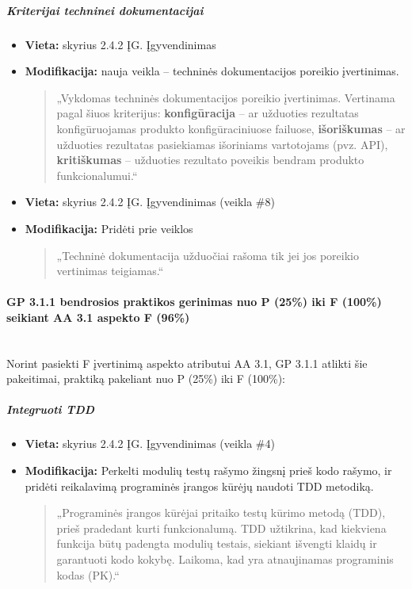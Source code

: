 \documentclass{article}
\newcommand{\subsubsubsection}[1]{\paragraph{#1}\mbox{}\\}
\begin{document}
\subparagraph{Kriterijai techninei dokumentacijai}
\begin{itemize}
    \item \textbf{Vieta:} skyrius 2.4.2  ĮG. Įgyvendinimas
    \item \textbf{Modifikacija:} nauja veikla -- techninės dokumentacijos poreikio įvertinimas.
    \begin{quote}
    „Vykdomas techninės dokumentacijos poreikio įvertinimas. Vertinama pagal šiuos kriterijus: \textbf{konfigūracija} -- ar užduoties rezultatas konfigūruojamas produkto konfigūraciniuose failuose, \textbf{išoriškumas} -- ar užduoties rezultatas pasiekiamas išoriniams vartotojams (pvz. API), \textbf{kritiškumas} -- užduoties rezultato poveikis bendram produkto funkcionalumui.“
    \end{quote}
\end{itemize}
\vspace{15pt}
\begin{itemize}
    \item \textbf{Vieta:} skyrius 2.4.2  ĮG. Įgyvendinimas (veikla \#8)
    \item \textbf{Modifikacija:} Pridėti prie veiklos
    \begin{quote}
    „Techninė dokumentacija užduočiai rašoma tik jei jos poreikio vertinimas teigiamas.“
    \end{quote}
\end{itemize}

\subsubsubsection{GP 3.1.1 bendrosios praktikos gerinimas nuo P (25\%) iki F (100\%) seikiant AA 3.1 aspekto  F (96\%)}

Norint pasiekti F įvertinimą aspekto atributui AA 3.1, GP 3.1.1 atlikti šie pakeitimai, praktiką pakeliant nuo P (25\%) iki F (100\%):

\subparagraph{Integruoti TDD}
\begin{itemize}
    \item \textbf{Vieta:} skyrius 2.4.2 ĮG. Įgyvendinimas (veikla \#4)
    \item \textbf{Modifikacija:} Perkelti modulių testų rašymo žingsnį prieš kodo rašymo, ir pridėti reikalavimą programinės įrangos kūrėjų naudoti TDD metodiką.
    \begin{quote}  „Programinės įrangos kūrėjai pritaiko testų kūrimo metodą (TDD), prieš pradedant kurti funkcionalumą. TDD užtikrina, kad kiekviena funkcija būtų padengta modulių testais, siekiant išvengti klaidų ir garantuoti kodo kokybę. Laikoma, kad yra atnaujinamas programinis kodas (PK).“
    \end{quote}
\end{itemize}
\end{document}
